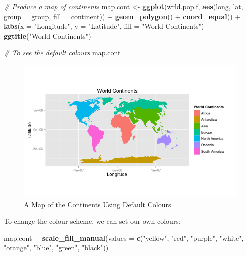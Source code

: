 \documentclass[]{article}
\newenvironment{Shaded}{}{}
\newcommand{\KeywordTok}[1]{\textcolor[rgb]{0.00,0.44,0.13}{\textbf{{#1}}}}
\newcommand{\DataTypeTok}[1]{\textcolor[rgb]{0.56,0.13,0.00}{{#1}}}
\newcommand{\StringTok}[1]{\textcolor[rgb]{0.25,0.44,0.63}{{#1}}}
\newcommand{\CommentTok}[1]{\textcolor[rgb]{0.38,0.63,0.69}{\textit{{#1}}}}
\newcommand{\NormalTok}[1]{{#1}}
\begin{document}
\begin{Shaded}
\begin{Highlighting}[]
\CommentTok{# Produce a map of continents}
\NormalTok{map.cont <-}\StringTok{ }\KeywordTok{ggplot}\NormalTok{(wrld.pop.f, }\KeywordTok{aes}\NormalTok{(long, lat, }\DataTypeTok{group =} \NormalTok{group, }\DataTypeTok{fill =} \NormalTok{continent)) +}\StringTok{ }
\StringTok{    }\KeywordTok{geom_polygon}\NormalTok{() +}\StringTok{ }\KeywordTok{coord_equal}\NormalTok{() +}\StringTok{ }\KeywordTok{labs}\NormalTok{(}\DataTypeTok{x =} \StringTok{"Longitude"}\NormalTok{, }\DataTypeTok{y =} \StringTok{"Latitude"}\NormalTok{, }\DataTypeTok{fill =} \StringTok{"World Continents"}\NormalTok{) +}\StringTok{ }
\StringTok{    }\KeywordTok{ggtitle}\NormalTok{(}\StringTok{"World Continents"}\NormalTok{)}

\CommentTok{# To see the default colours}
\NormalTok{map.cont}
\end{Highlighting}
\end{Shaded}

\begin{figure}[htbp]
\centering
\includegraphics{figure/A_Map_of_the_Continents_Using_Default_Colours.png}
\caption{A Map of the Continents Using Default Colours}
\end{figure}

To change the colour scheme, we can set our own colours:

\begin{Shaded}
\begin{Highlighting}[]
\NormalTok{map.cont +}\StringTok{ }\KeywordTok{scale_fill_manual}\NormalTok{(}\DataTypeTok{values =} \KeywordTok{c}\NormalTok{(}\StringTok{"yellow"}\NormalTok{, }\StringTok{"red"}\NormalTok{, }\StringTok{"purple"}\NormalTok{, }\StringTok{"white"}\NormalTok{, }
    \StringTok{"orange"}\NormalTok{, }\StringTok{"blue"}\NormalTok{, }\StringTok{"green"}\NormalTok{, }\StringTok{"black"}\NormalTok{))}
\end{Highlighting}
\end{Shaded}
\end{document}
